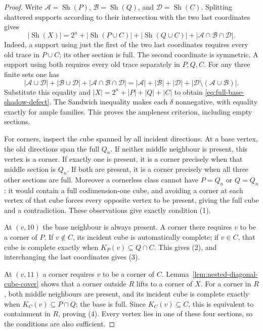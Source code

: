 \documentclass[11pt]{article}
\numberwithin{equation}{section}
\theoremstyle{definition}
\theoremstyle{remark}
\begin{document}
\begin{proof}
Write $\mathcal A=\operatorname{Sh}(P)$,
$\mathcal B=\operatorname{Sh}(Q)$, and
$\mathcal D=\operatorname{Sh}(C)$. Splitting shattered supports
according to their intersection with the two last coordinates gives
\[
 |\operatorname{Sh}(X)|=2^n+
 |\operatorname{Sh}(P\cup C)|+
 |\operatorname{Sh}(Q\cup C)|+
 |\mathcal A\cap\mathcal B\cap\mathcal D|.
\]
Indeed, a support using just the first of the two last coordinates
requires every old trace in $P\cup C$; its other section is full.
The second coordinate is symmetric. A support using both requires
every old trace separately in $P,Q,C$.
For any three finite sets one has
\[
 |\mathcal A\cup\mathcal D|+|\mathcal B\cup\mathcal D|
 +|\mathcal A\cap\mathcal B\cap\mathcal D|
 =|\mathcal A|+|\mathcal B|+|\mathcal D|
   +|\mathcal D\setminus(\mathcal A\cup\mathcal B)|.
\]
Substitute this equality and $|X|=2^n+|P|+|Q|+|C|$ to obtain
\eqref{eq:full-base-shadow-defect}. The Sandwich inequality makes
each $\delta$ nonnegative, with equality exactly for ample families.
This proves the ampleness criterion, including empty sections.

For corners, inspect the cube spanned by all incident directions.
At a base vertex, the old directions span the full $Q_n$. If neither
middle neighbour is present, this vertex is a corner. If exactly one
is present, it is a corner precisely when that middle section is
$Q_n$. If both are present, it is a corner precisely when all three
other sections are full. Moreover a cornerless class cannot have
$P=Q_n$ or $Q=Q_n$: it would contain a full codimension-one cube,
and avoiding a corner at each vertex of that cube forces every
opposite vertex to be present, giving the full cube and a contradiction.
These observations give exactly condition (1).

At $(v,10)$ the base neighbour is always present. A corner there
requires $v$ to be a corner of $P$. If $v\notin C$, its incident cube
is automatically complete; if $v\in C$, that cube is complete exactly
when $K_P(v)\subseteq Q\cap C$. This gives (2), and interchanging
the last coordinates gives (3).

At $(v,11)$ a corner requires $v$ to be a corner of $C$. Lemma~\ref{lem:nested-diagonal-cube-cover} shows that a corner outside $R$ lifts
to a corner of $X$. For a corner in $R$, both middle neighbours are
present, and its incident cube is complete exactly when
$K_C(v)\subseteq P\cap Q$; the base is full. Since $K_C(v)\subseteq C$,
this is equivalent to containment in $R$, proving (4).
Every vertex lies in one of these four sections, so the conditions
are also sufficient.
\end{proof}
\end{document}

